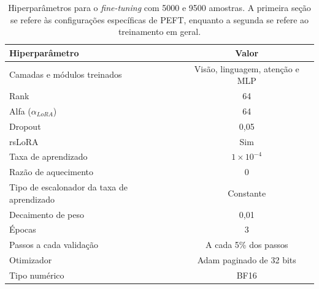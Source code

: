 \clearpage

\begin{table}[ht]
    \caption{\small Hiperparâmetros para o \textit{fine-tuning} com 5000 e 9500 amostras. A primeira seção se refere às configurações específicas de \ac{PEFT}, enquanto
    a segunda se refere ao treinamento em geral.}
    \centering
    \begin{tabular}{l|c}
        \hline
        Hiperparâmetro                             & Valor                                  \\ \hline
        Camadas e módulos treinados                & Visão, linguagem, atenção e \ac{MLP}   \\
        Rank                                       & 64                                     \\
        Alfa (\begin{math}\alpha_{LoRA}\end{math}) & 64                                     \\
        Dropout                                    & 0,05                                   \\
        \ac{rsLoRA}                                & Sim                                    \\ \hline
        Taxa de aprendizado                        & \begin{math}1 \times 10^{-4}\end{math} \\
        Razão de aquecimento                       & 0                                      \\
        Tipo de escalonador da taxa de aprendizado & Constante                              \\
        Decaimento de peso                         & 0,01                                   \\
        Épocas                                     & 3                                      \\
        Passos a cada validação                    & A cada 5\% dos passos                  \\
        Otimizador                                 & \ac{Adam} paginado de 32 bits          \\
        Tipo numérico                              & \ac{BF16}                              \\ \hline
    \end{tabular}
    \label{tab:qlora_5000_config}
\end{table}

